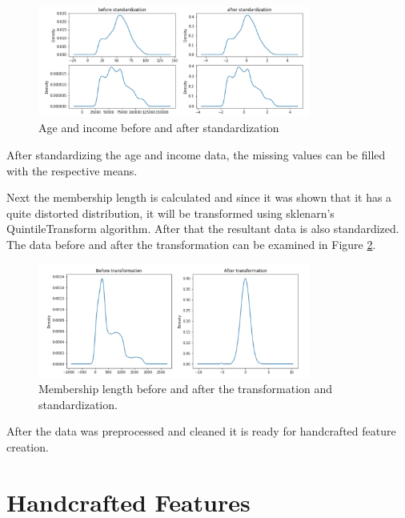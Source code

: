 \begin{figure}[h]
	\centering
	\includegraphics[width=0.8\textwidth]{fig/age_before_after.jpg}
	\vspace*{-0.1in}
	\caption{Age and income before and after standardization}
	\label{fig9}
	\vspace*{-0.2in}
	\bigskip
\end{figure}

After standardizing the age and income data, the missing values can be filled with the respective means. 

Next the membership length is calculated and since it was shown that it has a quite distorted distribution, it will be transformed using sklenarn's QuintileTransform algorithm. After that the resultant data is also standardized. The data before and after the transformation can be examined in Figure \ref{fig10}.

\begin{figure}[h]
	\centering
	\includegraphics[width=0.8\textwidth]{fig/membership_before_after.jpg}
	\vspace*{-0.1in}
	\caption{Membership length before and after the transformation and standardization.}
	\label{fig10}
	\vspace*{-0.2in}
	\bigskip
\end{figure}

After the data was preprocessed and cleaned it is ready for handcrafted feature creation.

\section{Handcrafted Features}


